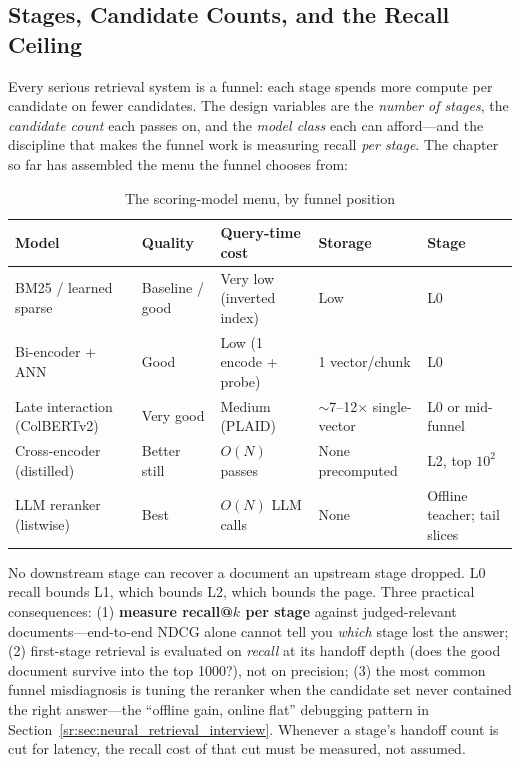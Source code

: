 \subsection{Stages, Candidate Counts, and the Recall Ceiling}

Every serious retrieval system is a funnel: each stage spends more compute per candidate on fewer candidates. The design variables are the \textit{number of stages}, the \textit{candidate count} each passes on, and the \textit{model class} each can afford---and the discipline that makes the funnel work is measuring recall \textit{per stage}. The chapter so far has assembled the menu the funnel chooses from:

\begin{table}[H]
\centering
\small
\caption{The scoring-model menu, by funnel position}
\label{sr:tab:model_menu}
\begin{tabularx}{\textwidth}{lXXXl}
\toprule
\textbf{Model} & \textbf{Quality} & \textbf{Query-time cost} & \textbf{Storage} & \textbf{Stage} \\
\midrule
BM25 / learned sparse & Baseline / good & Very low (inverted index) & Low & L0 \\
Bi-encoder + ANN & Good & Low (1 encode + probe) & 1 vector/chunk & L0 \\
Late interaction (ColBERTv2) & Very good & Medium (PLAID) & $\sim$7--12$\times$ single-vector & L0 or mid-funnel \\
Cross-encoder (distilled) & Better still & $O(N)$ passes & None precomputed & L2, top $10^2$ \\
LLM reranker (listwise) & Best & $O(N)$ LLM calls & None & Offline teacher; tail slices \\
\bottomrule
\end{tabularx}
\end{table}

\begin{keyinsight}
No downstream stage can recover a document an upstream stage dropped. L0 recall bounds L1, which bounds L2, which bounds the page. Three practical consequences: (1) \textbf{measure recall@$k$ per stage} against judged-relevant documents---end-to-end NDCG alone cannot tell you \textit{which} stage lost the answer; (2) first-stage retrieval is evaluated on \textit{recall} at its handoff depth (does the good document survive into the top 1000?), not on precision; (3) the most common funnel misdiagnosis is tuning the reranker when the candidate set never contained the right answer---the ``offline gain, online flat'' debugging pattern in Section~\ref{sr:sec:neural_retrieval_interview}. Whenever a stage's handoff count is cut for latency, the recall cost of that cut must be measured, not assumed.
\end{keyinsight}

